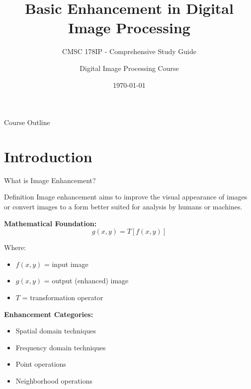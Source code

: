 \documentclass[aspectratio=169,10pt]{beamer}
\title{Basic Enhancement in Digital Image Processing}
\subtitle{CMSC 178IP - Comprehensive Study Guide}
\author{Digital Image Processing Course}
\institute{Computer Science Department}
\date{\today}
\begin{document}
\begin{frame}
\titlepage
\end{frame}

\begin{frame}{Course Outline}
\tableofcontents
\end{frame}

\section{Introduction}

\begin{frame}{What is Image Enhancement?}
\begin{alertblock}{Definition}
Image enhancement aims to improve the visual appearance of images or convert images to a form better suited for analysis by humans or machines.
\end{alertblock}

\textbf{Mathematical Foundation:}
$$g(x,y) = T[f(x,y)]$$

Where:
\begin{itemize}
\item $f(x,y)$ = input image
\item $g(x,y)$ = output (enhanced) image
\item $T$ = transformation operator
\end{itemize}

\textbf{Enhancement Categories:}
\begin{itemize}
\item Spatial domain techniques
\item Frequency domain techniques
\item Point operations
\item Neighborhood operations
\end{itemize}
\end{frame}
\end{document}
